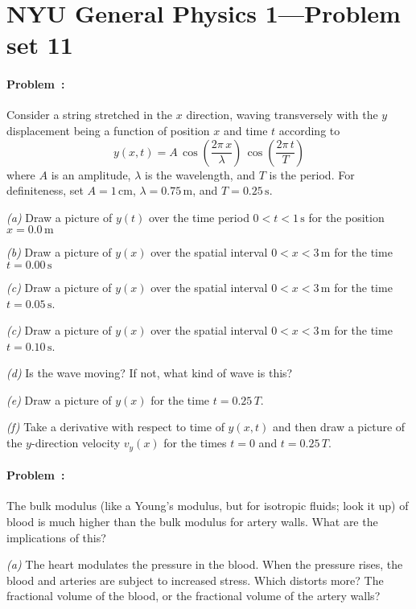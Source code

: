 \documentclass[12pt]{article}
\newcommand{\m}{\mathrm{m}}
\newcommand{\cm}{\mathrm{cm}}
\newcommand{\s}{\mathrm{s}}
\newcounter{problem}
\begin{document}
\thispagestyle{empty}

\section*{NYU General Physics 1---Problem set 11}

\paragraph{Problem~\theproblem:}%
Consider a string stretched in the $x$ direction, waving transversely
with the $y$ displacement being a function of position $x$ and time $t$ according to
$$ y(x,t) = A\,\cos(\frac{2\pi\,x}{\lambda})\,\cos(\frac{2\pi\,t}{T}) $$
where $A$ is an amplitude, $\lambda$ is the wavelength, and $T$ is
the period.  For definiteness, set $A=1\,\cm$, $\lambda=0.75\,\m$, and
$T=0.25\,\s$.

\textsl{(a)} Draw a picture of $y(t)$ over the time period $0<t<1\,\s$
for the position $x=0.0\,\m$

\textsl{(b)} Draw a picture of $y(x)$ over the spatial interval $0<x<3\,\m$
for the time $t=0.00\,\s$

\textsl{(c)} Draw a picture of $y(x)$ over the spatial interval $0<x<3\,\m$
for the time $t=0.05\,\s$.

\textsl{(c)} Draw a picture of $y(x)$ over the spatial interval $0<x<3\,\m$
for the time $t=0.10\,\s$.

\textsl{(d)} Is the wave moving?  If not, what kind of wave is this?

\textsl{(e)} Draw a picture of $y(x)$ for the time $t = 0.25\,T$.

\textsl{(f)} Take a derivative with respect to time of $y(x,t)$ and then draw a
picture of the $y$-direction velocity $v_y(x)$ for the times $t=0$ and $t =
0.25\,T$.

\paragraph{Problem~\theproblem:}%
The bulk modulus (like a Young's modulus, but for isotropic fluids;
look it up) of blood is much higher than the bulk modulus for artery
walls.  What are the implications of this?

\textsl{(a)} The heart modulates the pressure in the blood.  When the
pressure rises, the blood and arteries are subject to increased
stress.  Which distorts more?  The fractional volume of the blood, or
the fractional volume of the artery walls?
\end{document}
